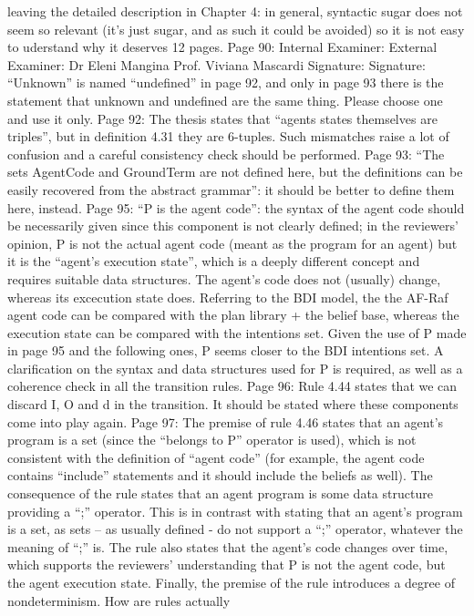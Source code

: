 \documentclass{article}
\newenvironment{them}{\noindent\begingroup\color{blue}}{\endgroup\par}
\begin{document}
\begin{them}
leaving the detailed description in Chapter 4: in general, syntactic sugar does not seem so relevant
(it's just sugar, and as such it could be avoided) so it is not easy to uderstand why it deserves 12
pages.
Page 90:
Internal Examiner: External Examiner:
Dr Eleni Mangina Prof. Viviana Mascardi
Signature: Signature:
“Unknown” is named “undefined” in page 92, and only in page 93 there is the statement that
unknown and undefined are the same thing. Please choose one and use it only.
Page 92:
The thesis states that “agents states themselves are triples”, but in definition 4.31 they are 6-tuples.
Such mismatches raise a lot of confusion and a careful consistency check should be performed.
Page 93:
“The sets AgentCode and GroundTerm are not defined here, but the definitions can be easily
recovered from the abstract grammar”: it should be better to define them here, instead.
Page 95:
“P is the agent code”: the syntax of the agent code should be necessarily given since this component
is not clearly defined; in the reviewers' opinion, P is not the actual agent code (meant as the program
for an agent) but it is the “agent's execution state”, which is a deeply different concept and requires
suitable data structures. The agent's code does not (usually) change, whereas its excecution state
does. Referring to the BDI model, the the AF-Raf agent code can be compared with the plan library +
the belief base, whereas the execution state can be compared with the intentions set. Given the use
of P made in page 95 and the following ones, P seems closer to the BDI intentions set. A clarification
on the syntax and data structures used for P is required, as well as a coherence check in all the
transition rules.
Page 96:
Rule 4.44 states that we can discard I, O and d in the transition. It should be stated where these
components come into play again.
Page 97:
The premise of rule 4.46 states that an agent's program is a set (since the “belongs to P” operator is
used), which is not consistent with the definition of “agent code” (for example, the agent code
contains “include” statements and it should include the beliefs as well). The consequence of the rule
states that an agent program is some data structure providing a “;” operator. This is in contrast with
stating that an agent's program is a set, as sets – as usually defined - do not support a “;” operator,
whatever the meaning of “;” is. The rule also states that the agent's code changes over time, which
supports the reviewers' understanding that P is not the agent code, but the agent execution state.
Finally, the premise of the rule introduces a degree of nondeterminism. How are rules actually

\end{them}
\end{document}
